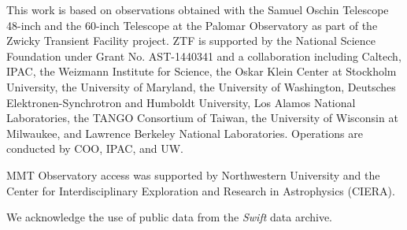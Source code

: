 \documentclass[twocolumn]{aastex63}
\begin{document}
This work is based on observations obtained with the Samuel Oschin Telescope
48-inch and the 60-inch Telescope at the Palomar Observatory as part of the
Zwicky Transient Facility project. ZTF is supported by the National Science
Foundation under Grant No. AST-1440341 and a collaboration including Caltech,
IPAC, the Weizmann Institute for Science, the Oskar Klein Center at Stockholm
University, the University of Maryland, the University of Washington,
Deutsches Elektronen-Synchrotron and Humboldt University, Los Alamos National
Laboratories, the TANGO Consortium of Taiwan, the University of Wisconsin at
Milwaukee, and Lawrence Berkeley National Laboratories. Operations are
conducted by COO, IPAC, and UW.

MMT Observatory access was supported by Northwestern University and the
Center for Interdisciplinary Exploration and Research in Astrophysics (CIERA).

We acknowledge the use of public data from the \textit{Swift} data archive.







\end{document}
